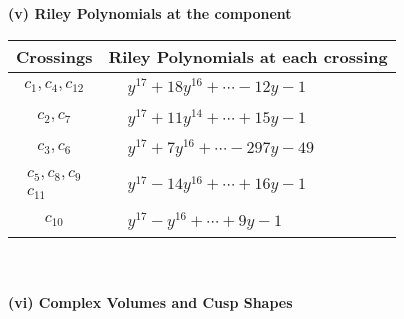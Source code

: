 \documentclass[1p]{elsarticle_modified}
\theoremstyle{definition}
\begin{document}
\newpage\renewcommand{\arraystretch}{1}
\flushleft \textbf{(v) Riley Polynomials at the component}\newline \\
\begin{tabular}{m{50pt}|m{274pt}}
Crossings & \hspace{64pt}Riley Polynomials at each crossing \\
\hline $$\begin{aligned}c_{1},c_{4},c_{12}\end{aligned}$$&$\begin{aligned}
&y^{17}+18 y^{16}+\cdots-12 y-1
\end{aligned}$\\
\hline $$\begin{aligned}c_{2},c_{7}\end{aligned}$$&$\begin{aligned}
&y^{17}+11 y^{14}+\cdots+15 y-1
\end{aligned}$\\
\hline $$\begin{aligned}c_{3},c_{6}\end{aligned}$$&$\begin{aligned}
&y^{17}+7 y^{16}+\cdots-297 y-49
\end{aligned}$\\
\hline $$\begin{aligned}c_{5},c_{8},c_{9}\\c_{11}\end{aligned}$$&$\begin{aligned}
&y^{17}-14 y^{16}+\cdots+16 y-1
\end{aligned}$\\
\hline $$\begin{aligned}c_{10}\end{aligned}$$&$\begin{aligned}
&y^{17}- y^{16}+\cdots+9 y-1
\end{aligned}$\\
\hline
\end{tabular}\\~\\
\newpage\flushleft \textbf{(vi) Complex Volumes and Cusp Shapes}
\end{document}
